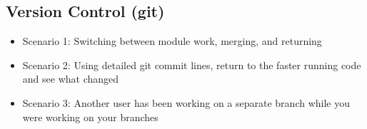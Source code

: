 \subsection{Version Control (git)}
\begin{itemize}
	\item Scenario 1: Switching between module work, merging, and returning
	\item Scenario 2: Using detailed git commit lines, return to the faster running code and see what changed
	\item Scenario 3: Another user has been working on a separate branch while you were working on your branches
\end{itemize}
















